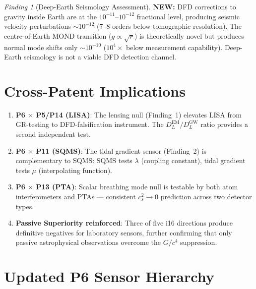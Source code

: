 \documentclass[11pt]{article}
\theoremstyle{definition}
\theoremstyle{remark}
\newtheorem{finding}[theorem]{Finding}
\newcommand{\newresult}[1]{\textcolor{green!50!black}{\textbf{NEW:} #1}}
\begin{document}
\begin{finding}[Deep-Earth Seismology Assessment]
\label{find:seismo}
\newresult{DFD corrections to gravity inside Earth are at the
$10^{-11}$--$10^{-12}$ fractional level, producing seismic
velocity perturbations $\sim 10^{-12}$ (7--8 orders below
tomographic resolution).  The centre-of-Earth MOND transition
($g \propto \sqrt{r}$) is theoretically novel but produces
normal mode shifts only $\sim 10^{-10}$ ($10^4\times$ below
measurement capability).  Deep-Earth seismology is not a
viable DFD detection channel.}
\end{finding}

\section{Cross-Patent Implications}
\label{sec:cross}

\begin{enumerate}[nosep]
\item \textbf{P6 $\times$ P5/P14 (LISA)}: The lensing null
  (Finding~1) elevates LISA from GR-testing to DFD-falsification
  instrument.  The $D_L^{\mathrm{EM}}/D_L^{\mathrm{GW}}$ ratio
  provides a second independent test.
\item \textbf{P6 $\times$ P11 (SQMS)}: The tidal gradient sensor
  (Finding~2) is complementary to SQMS: SQMS tests $\lambda$
  (coupling constant), tidal gradient tests $\mu$
  (interpolating function).
\item \textbf{P6 $\times$ P13 (PTA)}: Scalar breathing mode null
  is testable by both atom interferometers and PTAs ---
  consistent $c_s^2 \to 0$ prediction across two detector types.
\item \textbf{Passive Superiority reinforced}: Three of five
  i16 directions produce definitive negatives for laboratory
  sensors, further confirming that only passive astrophysical
  observations overcome the $G/c^4$ suppression.
\end{enumerate}

\section{Updated P6 Sensor Hierarchy}
\label{sec:hierarchy}
\end{document}

